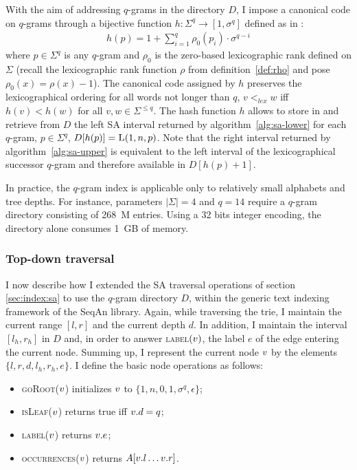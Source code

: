 With the aim of addressing $q$-grams in the directory $D$, I impose a canonical code on $q$-grams through a bijective function $h : \Sigma^q \rightarrow [1, \sigma^q]$ defined as in \citep{Knuth1973}:
\begin{eqnarray}
h(p) = 1 + \sum_{i=1}^{q}{\rho_0(p_i) \cdot \sigma^{q-i}}
\end{eqnarray}
where $p \in \Sigma^q$ is any $q$-gram and $\rho_0$ is the zero-based lexicographic rank defined on $\Sigma$ (recall the lexicographic rank function $\rho$ from definition~\ref{def:rho} and pose $\rho_0(x) = \rho(x) - 1$).
The canonical code assigned by $h$ preserves the lexicographical ordering for all words not longer than $q$, \ie $v <_{lex} w$ iff $h(v) < h(w)$ for all $v,w \in \Sigma^{\leq q}$.
The hash function $h$ allows to store in and retrieve from $D$ the left SA interval returned by algorithm~\ref{alg:sa-lower} for each $q$-gram, \ie $p \in \Sigma^q$, $D[h(p)] = \textsc{L}(1,n,p)$.
Note that the right interval returned by algorithm~\ref{alg:sa-upper} is equivalent to the left interval of the lexicographical successor $q$-gram and therefore available in $D[h(p)+1]$.

In practice, the $q$-gram index is applicable only to relatively small alphabets and tree depths.
For instance, parameters $|\Sigma| = 4$ and $q=14$ require a $q$-gram directory consisting of 268~M entries.
Using a 32 bits integer encoding, the directory alone consumes 1~GB of memory.

\subsubsection{Top-down traversal}

I now describe how I extended the SA traversal operations of section \ref{sec:index:sa} to use the $q$-gram directory $D$, within the generic text indexing framework of the SeqAn library.
Again, while traversing the trie, I maintain the current range $[l,r]$ and the current depth $d$.
In addition, I maintain the interval $[l_h,r_h]$ in $D$ and, in order to answer \textsc{label}$(v)$, the label $e$ of the edge entering the current node.
Summing up, I represent the current node $v$ by the elements $\{ l, r, d, l_h, r_h, e \}$.
I define the basic node operations as follows:
\begin{itemize}
\item \textsc{goRoot}($v$) initializes $v$ to $\{ 1, n, 0, 1, \sigma^q, \epsilon \}$;
\item \textsc{isLeaf}($v$) returns true iff $v.d=q$;
\item \textsc{label}($v$) returns $v.e$;
\item \textsc{occurrences}($v$) returns $A[v.l \dots v.r]$.
\end{itemize}

